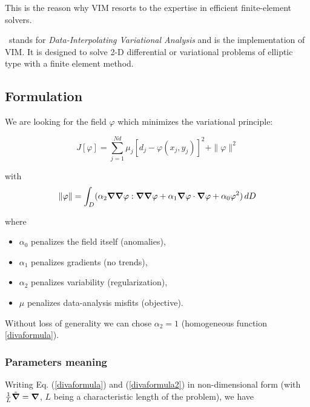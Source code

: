 This is the reason why VIM resorts to the expertise in efficient finite-element solvers.

\diva\, stands for \textit{Data-Interpolating Variational Analysis} and is the implementation of VIM. It is designed to solve 2-D differential or variational problems of elliptic type with a finite element method.


\subsection{Formulation\label{sec:formulation}}

We are looking for the field $\varphi$ which minimizes the variational principle:

\begin{equation}
J \left[\varphi\right] =\sum_{j=1}^{Nd}\mu_{j}\left[d_{j}-\varphi(x_{j},y_{j})\right]^{2}+
\| \varphi\| ^{2}
\label{divaformula}
\end{equation}

with
\begin{equation}
\|\varphi\|=\int_{D}(
\alpha_{2} 
\boldsymbol{\nabla}\boldsymbol{\nabla}\varphi : \boldsymbol{\nabla}\boldsymbol{\nabla}\varphi +\alpha_{1}
\boldsymbol{\nabla}\varphi \cdot \boldsymbol{\nabla}\varphi + \alpha_{0} \varphi^{2})\, d D
\label{divaformula2}
\end{equation}

where
\begin{itemize}
\item
$\alpha_0$ penalizes the field itself (anomalies),
\item
$\alpha_1$ penalizes gradients (no trends),
\item 
$\alpha_2$ penalizes variability (regularization),
\item 
$\mu$ penalizes data-analysis misfits (objective).
\end{itemize}
Without loss of generality we can chose $\alpha_2=1$ (homogeneous function \ref{divaformula}).



\subsubsection{Parameters meaning\label{sec:parammeaning}}

Writing Eq. (\ref{divaformula}) and (\ref{divaformula2}) in non-dimensional form (with $\frac{1}{L}\tilde{\boldsymbol{\nabla}}=\boldsymbol{\nabla}$, $L$ being a characteristic length of the problem), we have

